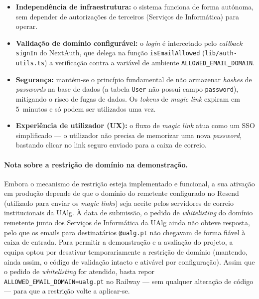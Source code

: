 \documentclass[11pt,a4paper]{article}
\begin{document}
\begin{itemize}[leftmargin=*]
    \item \textbf{Independência de infraestrutura:} o sistema funciona de forma
          autónoma, sem depender de autorizações de terceiros (Serviços de
          Informática) para operar.
    \item \textbf{Validação de domínio configurável:} o \emph{login} é
          intercetado pelo \emph{callback} \texttt{signIn} do NextAuth, que
          delega na função \texttt{isEmailAllowed} (\texttt{lib/auth-utils.ts})
          a verificação contra a variável de ambiente
          \texttt{ALLOWED\_EMAIL\_DOMAIN}.
    \item \textbf{Segurança:} mantém-se o princípio fundamental de não armazenar
          \emph{hashes} de \emph{passwords} na base de dados (a tabela
          \texttt{User} não possui campo \texttt{password}), mitigando o risco de
          fugas de dados. Os \emph{tokens} de \emph{magic link} expiram em
          5~minutos e só podem ser utilizados uma vez.
    \item \textbf{Experiência de utilizador (UX):} o fluxo de \emph{magic link}
          atua como um SSO simplificado --- o utilizador não precisa de
          memorizar uma nova \emph{password}, bastando clicar no link seguro
          enviado para a caixa de correio.
\end{itemize}

\paragraph{Nota sobre a restrição de domínio na demonstração.}
Embora o mecanismo de restrição esteja implementado e funcional, a sua
ativação em produção depende de que o domínio do remetente configurado no
Resend (utilizado para enviar os \emph{magic links}) seja aceite pelos
servidores de correio institucionais da UAlg. À data de submissão, o pedido
de \emph{whitelisting} do domínio remetente junto dos Serviços de Informática
da UAlg ainda não obteve resposta, pelo que os emails para destinatários
\texttt{@ualg.pt} não chegavam de forma fiável à caixa de entrada. Para
permitir a demonstração e a avaliação do projeto, a equipa optou por
desativar temporariamente a restrição de domínio (mantendo, ainda assim, o
código de validação intacto e ativável por configuração). Assim que o pedido
de \emph{whitelisting} for atendido, basta repor
\texttt{ALLOWED\_EMAIL\_DOMAIN=ualg.pt} no Railway --- sem qualquer alteração
de código --- para que a restrição volte a aplicar-se.
\end{document}

